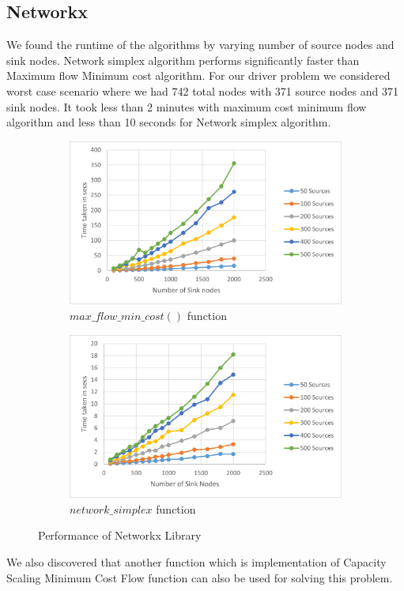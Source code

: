 \documentclass{article}
\begin{document}
\subsection{Networkx}
We found the runtime of the algorithms by varying number of source nodes and sink nodes. Network simplex algorithm performs significantly faster than Maximum flow Minimum cost algorithm. For our driver problem we considered worst case scenario where we had 742 total nodes with 371 source nodes and 371 sink nodes. It took less than 2 minutes with maximum cost minimum flow algorithm and less than 10 seconds for Network simplex algorithm. 
\begin{figure}[h]
\centering
\begin{subfigure}{0.5\textwidth}
  \centering
  \includegraphics[width=0.9\linewidth]{mcmf.png}
  \caption{$max\_flow\_min\_cost()$ function}
  \label{fig:sub1}
\end{subfigure}%
\begin{subfigure}{0.5\textwidth}
  \centering
  \includegraphics[width=0.9\linewidth]{lp.png}
  \caption{$network\_simplex$ function}
  \label{fig:sub2}
\end{subfigure}
\caption{Performance of Networkx Library }
\label{fig:test}
\end{figure}
We also discovered that another function which is implementation of Capacity Scaling Minimum Cost Flow function can also be used for solving this problem. 
\end{document}

